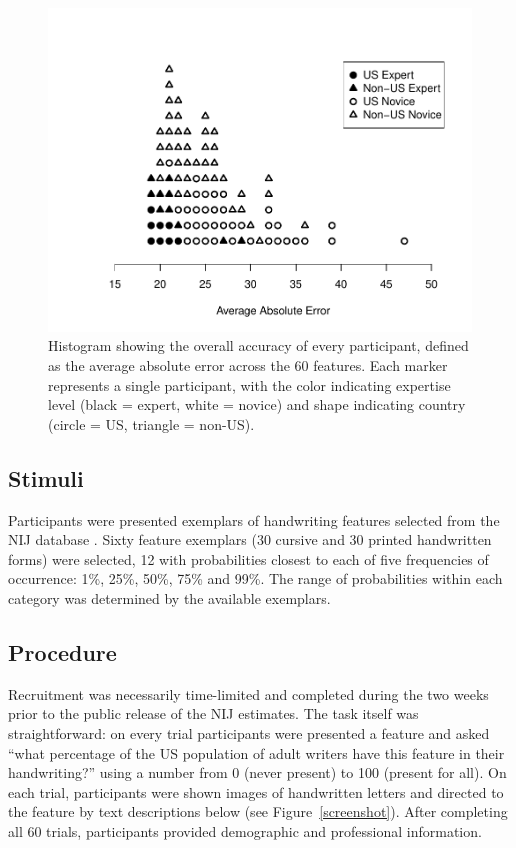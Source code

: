 \documentclass[doc]{apa6} %
\begin{document}
\begin{figure}[p]
\begin{center}
\includegraphics[scale=.7]{performance.pdf}
\caption{Histogram showing the overall accuracy of every participant, defined as the average absolute error across the 60 features. Each marker represents a single participant, with the color indicating expertise level (black = expert, white = novice) and shape indicating country (circle = US, triangle = non-US).}
\label{performance}
\end{center}
\end{figure}

\subsection{Stimuli}

Participants were presented exemplars of handwriting features selected from the NIJ database \cite{johnson2016measuring}. Sixty feature exemplars (30 cursive and 30 printed handwritten forms) were selected, 12 with probabilities closest to each of five frequencies of occurrence: 1\%, 25\%, 50\%, 75\% and 99\%. The range of probabilities within each category was determined by the available exemplars.

\subsection{Procedure}

Recruitment was necessarily time-limited and completed during the two weeks prior to the public release of the NIJ estimates. The task itself was straightforward: on every trial participants were presented a feature and asked  ``what percentage of the US population of adult writers have this feature in their handwriting?'' using a number from 0 (never present) to 100 (present for all). On each trial, participants were shown images of handwritten letters and directed to the feature by text descriptions below (see Figure~\ref{screenshot}). After completing all 60 trials, participants provided demographic and professional information.
\end{document}
